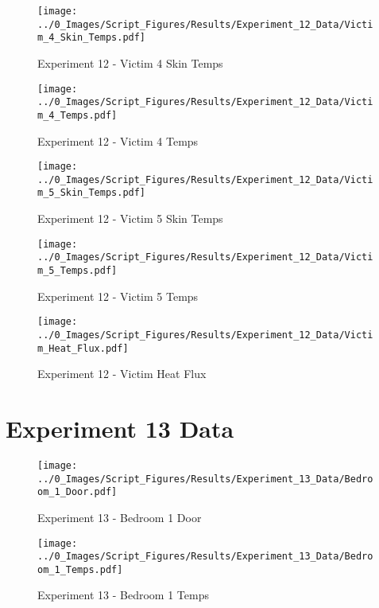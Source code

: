 	\clearpage

	\begin{figure}[H]
		\centering
		\texttt{[image: ../0\_Images/Script\_Figures/Results/Experiment\_12\_Data/Victim\_4\_Skin\_Temps.pdf]}
		\caption[]{Experiment 12 - Victim 4 Skin Temps}
	\end{figure}
 

	\begin{figure}[H]
		\centering
		\texttt{[image: ../0\_Images/Script\_Figures/Results/Experiment\_12\_Data/Victim\_4\_Temps.pdf]}
		\caption[]{Experiment 12 - Victim 4 Temps}
	\end{figure}
 
	\clearpage

	\begin{figure}[H]
		\centering
		\texttt{[image: ../0\_Images/Script\_Figures/Results/Experiment\_12\_Data/Victim\_5\_Skin\_Temps.pdf]}
		\caption[]{Experiment 12 - Victim 5 Skin Temps}
	\end{figure}
 

	\begin{figure}[H]
		\centering
		\texttt{[image: ../0\_Images/Script\_Figures/Results/Experiment\_12\_Data/Victim\_5\_Temps.pdf]}
		\caption[]{Experiment 12 - Victim 5 Temps}
	\end{figure}
 
	\clearpage

	\begin{figure}[H]
		\centering
		\texttt{[image: ../0\_Images/Script\_Figures/Results/Experiment\_12\_Data/Victim\_Heat\_Flux.pdf]}
		\caption[]{Experiment 12 - Victim Heat Flux}
	\end{figure}
 

\clearpage		\large
\section{Experiment 13 Data} \label{App:Exp13Results} 

	\begin{figure}[H]
		\centering
		\texttt{[image: ../0\_Images/Script\_Figures/Results/Experiment\_13\_Data/Bedroom\_1\_Door.pdf]}
		\caption[]{Experiment 13 - Bedroom 1 Door}
	\end{figure}
 

	\begin{figure}[H]
		\centering
		\texttt{[image: ../0\_Images/Script\_Figures/Results/Experiment\_13\_Data/Bedroom\_1\_Temps.pdf]}
		\caption[]{Experiment 13 - Bedroom 1 Temps}
	\end{figure}
 
